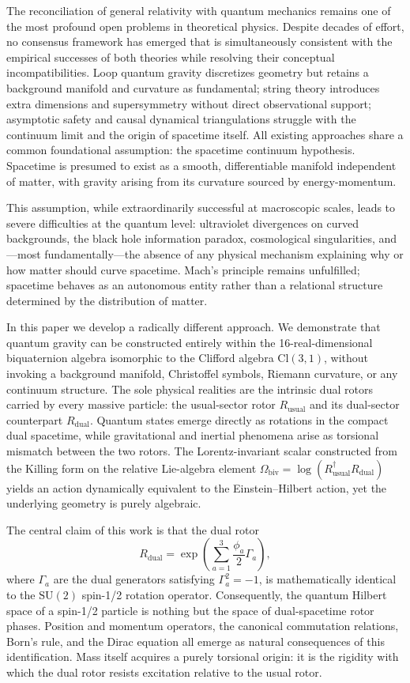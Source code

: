 \documentclass[dvipdfmx,11pt,a4paper]{article}
\begin{document}
The reconciliation of general relativity with quantum mechanics remains one of the most profound open problems in theoretical physics. Despite decades of effort, no consensus framework has emerged that is simultaneously consistent with the empirical successes of both theories while resolving their conceptual incompatibilities. Loop quantum gravity discretizes geometry but retains a background manifold and curvature as fundamental; string theory introduces extra dimensions and supersymmetry without direct observational support; asymptotic safety and causal dynamical triangulations struggle with the continuum limit and the origin of spacetime itself. All existing approaches share a common foundational assumption: the spacetime continuum hypothesis. Spacetime is presumed to exist as a smooth, differentiable manifold independent of matter, with gravity arising from its curvature sourced by energy-momentum.

This assumption, while extraordinarily successful at macroscopic scales, leads to severe difficulties at the quantum level: ultraviolet divergences on curved backgrounds, the black hole information paradox, cosmological singularities, and—most fundamentally—the absence of any physical mechanism explaining why or how matter should curve spacetime. Mach's principle remains unfulfilled; spacetime behaves as an autonomous entity rather than a relational structure determined by the distribution of matter.

In this paper we develop a radically different approach. We demonstrate that quantum gravity can be constructed entirely within the 16-real-dimensional biquaternion algebra isomorphic to the Clifford algebra $\mathrm{Cl}(3,1)$, without invoking a background manifold, Christoffel symbols, Riemann curvature, or any continuum structure. The sole physical realities are the intrinsic dual rotors carried by every massive particle: the usual-sector rotor $R_\text{usual}$ and its dual-sector counterpart $R_\text{dual}$. Quantum states emerge directly as rotations in the compact dual spacetime, while gravitational and inertial phenomena arise as torsional mismatch between the two rotors. The Lorentz-invariant scalar constructed from the Killing form on the relative Lie-algebra element $\Omega_\text{biv} = \log(R_\text{usual}^\dagger R_\text{dual})$ yields an action dynamically equivalent to the Einstein--Hilbert action, yet the underlying geometry is purely algebraic.

The central claim of this work is that the dual rotor
\[
R_\text{dual} = \exp\left( \sum_{a=1}^3 \frac{\phi_a}{2} \Gamma_a \right),
\]
where $\Gamma_a$ are the dual generators satisfying $\Gamma_a^2 = -1$, is mathematically identical to the $\mathrm{SU}(2)$ spin-1/2 rotation operator. Consequently, the quantum Hilbert space of a spin-1/2 particle is nothing but the space of dual-spacetime rotor phases. Position and momentum operators, the canonical commutation relations, Born's rule, and the Dirac equation all emerge as natural consequences of this identification. Mass itself acquires a purely torsional origin: it is the rigidity with which the dual rotor resists excitation relative to the usual rotor.
\end{document}
